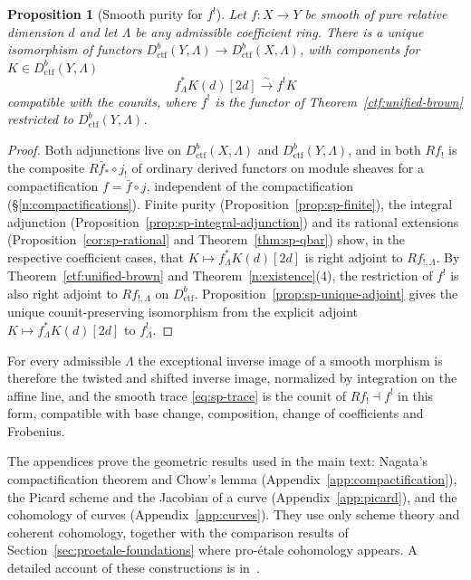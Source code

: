 \documentclass[11pt,a4paper]{article}
\numberwithin{equation}{section}
\newtheorem{proposition}[theorem]{Proposition}
\theoremstyle{definition}
\theoremstyle{remark}
\newcommand{\Dctf}{D^b_{\mathrm{ctf}}}
\begin{document}
\begin{proposition}[Smooth purity for $f^!$]
\label{prop:sp-comparison-brown}
Let $f:X\to Y$ be smooth of pure relative dimension $d$ and let
$\Lambda$ be any admissible coefficient ring. There is a unique
isomorphism of functors $\Dctf(Y,\Lambda)\to\Dctf(X,\Lambda)$, with
components for $K\in\Dctf(Y,\Lambda)$
\[
 f_\Lambda^*K(d)[2d]\xrightarrow{\sim}f^!K
\]
compatible with the counits, where $f^!$ is the functor of
Theorem~\ref{ctf:unified-brown} restricted to $\Dctf(Y,\Lambda)$.
\end{proposition}
\begin{proof}
Both adjunctions live on $\Dctf(X,\Lambda)$ and $\Dctf(Y,\Lambda)$, and in
both $Rf_!$ is the composite
$R\bar f_*\circ j_!$ of ordinary derived functors on module sheaves for a
compactification $f=\bar f\circ j$, independent of the compactification
(\S\ref{n:compactifications}). Finite purity (Proposition~\ref{prop:sp-finite}), the integral
adjunction (Proposition~\ref{prop:sp-integral-adjunction}) and its
rational extensions (Proposition~\ref{cor:sp-rational} and
Theorem~\ref{thm:sp-qbar}) show, in the respective
coefficient cases, that $K\mapsto f_\Lambda^*K(d)[2d]$ is
right adjoint to $Rf_{!,\Lambda}$. By Theorem~\ref{ctf:unified-brown}
and Theorem~\ref{n:existence}(4), the restriction of $f^!$ is also
right adjoint to $Rf_{!,\Lambda}$ on $\Dctf$.
Proposition~\ref{prop:sp-unique-adjoint} gives the unique
counit-preserving isomorphism from the explicit adjoint
$K\mapsto f_\Lambda^*K(d)[2d]$ to $f_\Lambda^!$.
\end{proof}

For every admissible $\Lambda$ the exceptional inverse image of a
smooth morphism is therefore the twisted and shifted inverse image,
normalized by integration on the affine line, and the smooth trace
\eqref{eq:sp-trace} is the counit of $Rf_!\dashv f^!$ in this form,
compatible with base change, composition, change of coefficients and
Frobenius.

\clearpage
\appendix
\noindent The appendices prove the geometric results used in the main
text: Nagata's compactification theorem and Chow's lemma
(Appendix~\ref{app:compactification}), the Picard scheme and the
Jacobian of a curve (Appendix~\ref{app:picard}), and the cohomology of
curves (Appendix~\ref{app:curves}). They use only scheme theory and
coherent cohomology, together with the comparison results of
Section~\ref{sec:proetale-foundations} where pro-\'etale cohomology
appears. A detailed account of these constructions is
in~\cite{BlueprintGeometry}.
\end{document}
